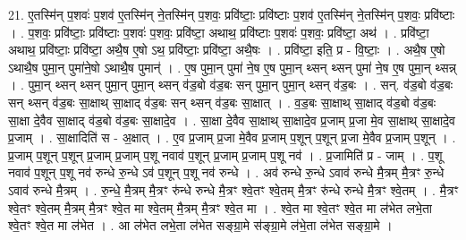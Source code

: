 \documentclass[17pt]{extarticle}
\begin{document}
21. ए॒तस्मि॑न् प॒शवः॑ प॒शव॑ ए॒तस्मि॑न् ने॒तस्मि॑न् प॒शवः॒ प्रवि॑ष्टाः॒ प्रवि॑ष्टाः प॒शव॑ ए॒तस्मि॑न् ने॒तस्मि॑न् प॒शवः॒ प्रवि॑ष्टाः । . प॒शवः॒ प्रवि॑ष्टाः॒ प्रवि॑ष्टाः प॒शवः॑ प॒शवः॒ प्रवि॑ष्टा॒ अथाथ॒ प्रवि॑ष्टाः प॒शवः॑ प॒शवः॒ प्रवि॑ष्टा॒ अथ॑ । . प्रवि॑ष्टा॒ अथाथ॒ प्रवि॑ष्टाः॒ प्रवि॑ष्टा॒ अथै॒ष ए॒षो ऽथ॒ प्रवि॑ष्टाः॒ प्रवि॑ष्टा॒ अथै॒षः । . प्रवि॑ष्टा॒ इति॒ प्र - वि॒ष्टाः॒ । . अथै॒ष ए॒षो ऽथाथै॒ष पुमा॒न् पुमा॑ने॒षो ऽथाथै॒ष पुमान्॑ । . ए॒ष पुमा॒न् पुमा॑ ने॒ष ए॒ष पुमा॒न् थ्सन् थ्सन् पुमा॑ ने॒ष ए॒ष पुमा॒न् थ्सन्न् । . पुमा॒न् थ्सन् थ्सन् पुमा॒न् पुमा॒न् थ्सन् व॑ड॒बो व॑ड॒बः सन् पुमा॒न् पुमा॒न् थ्सन् व॑ड॒बः । . सन्. व॑ड॒बो व॑ड॒बः सन् थ्सन् व॑ड॒बः सा॒क्षाथ् सा॒क्षाद् व॑ड॒बः सन् थ्सन् व॑ड॒बः सा॒क्षात् । . व॒ड॒बः सा॒क्षाथ् सा॒क्षाद् व॑ड॒बो व॑ड॒बः सा॒क्षा दे॒वैव सा॒क्षाद् व॑ड॒बो व॑ड॒बः सा॒क्षादे॒व । . सा॒क्षा दे॒वैव सा॒क्षाथ् सा॒क्षादे॒व प्र॒जाम् प्र॒जा मे॒व सा॒क्षाथ् सा॒क्षादे॒व प्र॒जाम् । . सा॒क्षादिति॑ स - अ॒क्षात् । . ए॒व प्र॒जाम् प्र॒जा मे॒वैव प्र॒जाम् प॒शून् प॒शून् प्र॒जा मे॒वैव प्र॒जाम् प॒शून् । . प्र॒जाम् प॒शून् प॒शून् प्र॒जाम् प्र॒जाम् प॒शू नवाव॑ प॒शून् प्र॒जाम् प्र॒जाम् प॒शू नव॑ । . प्र॒जामिति॑ प्र - जाम् । . प॒शू नवाव॑ प॒शून् प॒शू नव॑ रुन्धे रु॒न्धे ऽव॑ प॒शून् प॒शू नव॑ रुन्धे । . अव॑ रुन्धे रु॒न्धे ऽवाव॑ रुन्धे मै॒त्रम् मै॒त्रꣳ रु॒न्धे ऽवाव॑ रुन्धे मै॒त्रम् । . रु॒न्धे॒ मै॒त्रम् मै॒त्रꣳ रु॑न्धे रुन्धे मै॒त्रꣳ श्वे॒तꣳ श्वे॒तम् मै॒त्रꣳ रु॑न्धे रुन्धे मै॒त्रꣳ श्वे॒तम् । . मै॒त्रꣳ श्वे॒तꣳ श्वे॒तम् मै॒त्रम् मै॒त्रꣳ श्वे॒त मा श्वे॒तम् मै॒त्रम् मै॒त्रꣳ श्वे॒त मा । . श्वे॒त मा श्वे॒तꣳ श्वे॒त मा ल॑भेत लभे॒ता श्वे॒तꣳ श्वे॒त मा ल॑भेत । . आ ल॑भेत लभे॒ता ल॑भेत सङ्ग्रा॒मे स॑ङ्ग्रा॒मे ल॑भे॒ता ल॑भेत सङ्ग्रा॒मे । \newline
\end{document}
